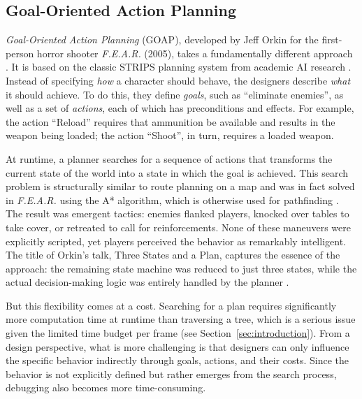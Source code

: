 
\subsection{Goal-Oriented Action Planning}


\emph{Goal-Oriented Action Planning} (GOAP), developed by Jeff Orkin for the first-person  horror shooter \emph{F.E.A.R.} (2005), takes a fundamentally different approach \cite{orkin2004,orkin2006}. It is based on the classic STRIPS planning system from academic AI research \cite{fikes1971}. Instead of specifying \emph{how} a character should behave, the designers describe \emph{what} it should achieve. To do this, they define \emph{goals}, such as \glqq “eliminate enemies”\grqq{}, as well as a set of \emph{actions}, each of which has preconditions and effects. For example, the action \glqq “Reload”\grqq{} requires that ammunition be available and results in the weapon being loaded; the action \glqq “Shoot”\grqq{}, in turn, requires a loaded weapon.

At runtime, a planner searches for a sequence of actions that transforms the current state of the world into a state in which the goal is achieved. This search problem is structurally similar to route planning on a map and was in fact solved in \emph{F.E.A.R.} using the A* algorithm, which is otherwise used for pathfinding \cite{orkin2006,hart1968}. The result was emergent tactics: enemies flanked players, knocked over tables to take cover, or retreated to call for reinforcements. None of these maneuvers were explicitly scripted, yet players perceived the behavior as remarkably intelligent. The title of Orkin’s talk, \glqq Three States and a Plan\grqq{}, captures the essence of the approach: the remaining state machine was reduced to just three states, while the actual decision-making logic was entirely handled by the planner \cite{orkin2006}.

But this flexibility comes at a cost. Searching for a plan requires significantly more computation time at runtime than traversing a tree, which is a serious issue given the limited time budget per frame (see Section~\ref{sec:introduction}). From a design perspective, what is more challenging is that designers can only influence the specific behavior indirectly through goals, actions, and their costs. Since the behavior is not explicitly defined but rather emerges from the search process, debugging also becomes more time-consuming.

